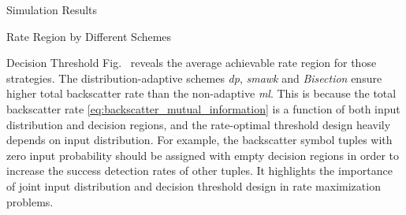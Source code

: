\documentclass[journal]{IEEEtran}
\begin{document}
\begin{section}{Simulation Results}
\begin{subsection}{Rate Region by Different Schemes}
\begin{subsubsection}{Decision Threshold}
			Fig.~ reveals the average achievable rate region for those strategies.
			The distribution-adaptive schemes \emph{\gls{dp}}, \emph{\gls{smawk}} and \emph{Bisection} ensure higher total backscatter rate than the non-adaptive \emph{\gls{ml}}.
			This is because the total backscatter rate \eqref{eq:backscatter_mutual_information} is a function of both input distribution and decision regions, and the rate-optimal threshold design heavily depends on input distribution.
			For example, the backscatter symbol tuples with zero input probability should be assigned with empty decision regions in order to increase the success detection rates of other tuples.
			It highlights the importance of joint input distribution and decision threshold design in rate maximization problems.
		\end{subsubsection}

	\end{subsection}



\end{section}
\end{document}
